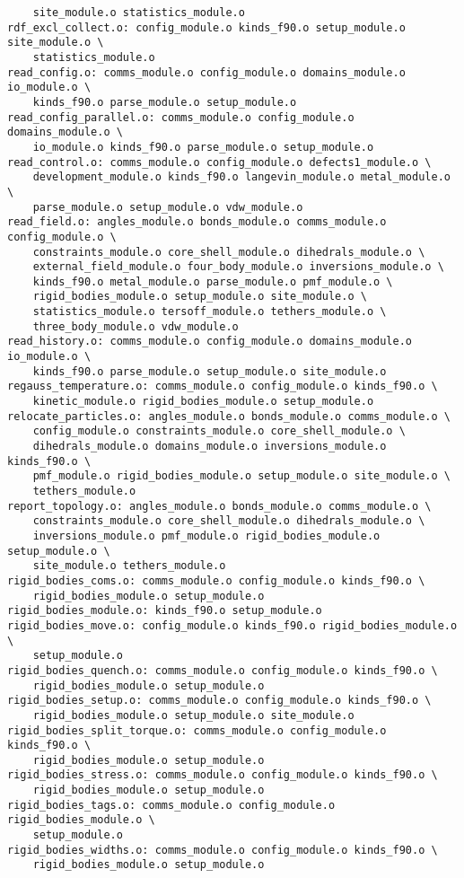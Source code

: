 \begin{verbatim}
	site_module.o statistics_module.o
rdf_excl_collect.o: config_module.o kinds_f90.o setup_module.o site_module.o \
	statistics_module.o
read_config.o: comms_module.o config_module.o domains_module.o io_module.o \
	kinds_f90.o parse_module.o setup_module.o
read_config_parallel.o: comms_module.o config_module.o domains_module.o \
	io_module.o kinds_f90.o parse_module.o setup_module.o
read_control.o: comms_module.o config_module.o defects1_module.o \
	development_module.o kinds_f90.o langevin_module.o metal_module.o \
	parse_module.o setup_module.o vdw_module.o
read_field.o: angles_module.o bonds_module.o comms_module.o config_module.o \
	constraints_module.o core_shell_module.o dihedrals_module.o \
	external_field_module.o four_body_module.o inversions_module.o \
	kinds_f90.o metal_module.o parse_module.o pmf_module.o \
	rigid_bodies_module.o setup_module.o site_module.o \
	statistics_module.o tersoff_module.o tethers_module.o \
	three_body_module.o vdw_module.o
read_history.o: comms_module.o config_module.o domains_module.o io_module.o \
	kinds_f90.o parse_module.o setup_module.o site_module.o
regauss_temperature.o: comms_module.o config_module.o kinds_f90.o \
	kinetic_module.o rigid_bodies_module.o setup_module.o
relocate_particles.o: angles_module.o bonds_module.o comms_module.o \
	config_module.o constraints_module.o core_shell_module.o \
	dihedrals_module.o domains_module.o inversions_module.o kinds_f90.o \
	pmf_module.o rigid_bodies_module.o setup_module.o site_module.o \
	tethers_module.o
report_topology.o: angles_module.o bonds_module.o comms_module.o \
	constraints_module.o core_shell_module.o dihedrals_module.o \
	inversions_module.o pmf_module.o rigid_bodies_module.o setup_module.o \
	site_module.o tethers_module.o
rigid_bodies_coms.o: comms_module.o config_module.o kinds_f90.o \
	rigid_bodies_module.o setup_module.o
rigid_bodies_module.o: kinds_f90.o setup_module.o
rigid_bodies_move.o: config_module.o kinds_f90.o rigid_bodies_module.o \
	setup_module.o
rigid_bodies_quench.o: comms_module.o config_module.o kinds_f90.o \
	rigid_bodies_module.o setup_module.o
rigid_bodies_setup.o: comms_module.o config_module.o kinds_f90.o \
	rigid_bodies_module.o setup_module.o site_module.o
rigid_bodies_split_torque.o: comms_module.o config_module.o kinds_f90.o \
	rigid_bodies_module.o setup_module.o
rigid_bodies_stress.o: comms_module.o config_module.o kinds_f90.o \
	rigid_bodies_module.o setup_module.o
rigid_bodies_tags.o: comms_module.o config_module.o rigid_bodies_module.o \
	setup_module.o
rigid_bodies_widths.o: comms_module.o config_module.o kinds_f90.o \
	rigid_bodies_module.o setup_module.o

\end{verbatim}
